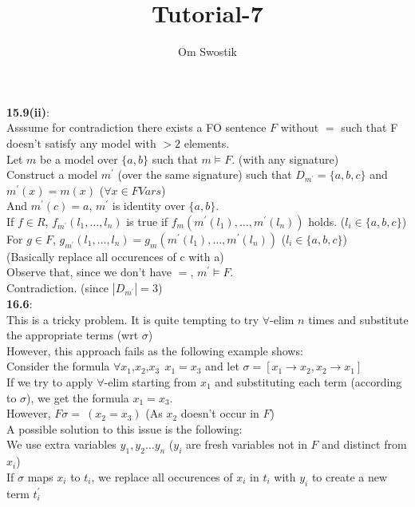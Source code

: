 \documentclass{article}
\title{Tutorial-7}
\author{Om Swostik}
\date{}
\begin{document}
\maketitle
\begin{flushleft}
\textbf{15.9(ii)}: \\
Asssume for contradiction there exists a FO sentence $F$ without $=$ such that F doesn't satisfy any model with $> 2$ elements.\\
Let $m$ be a model over $\{a,b\}$ such that $m \models F$. (with any signature)\\
Construct a model $m^{'}$ (over the same signature) such that $D_{m^{'}}=\{a,b,c\}$ and $m^{'}(x)=m(x)$ ($\forall x\in FVars$)\\
And $m^{'}(c)=a$, $m^{'}$ is identity over $\{a,b\}$.\\
If $f\in R$, $f_{m^{'}}(l_1,\dots,l_n)$ is true if $f_m(m^{'}(l_1),\dots,m^{'}(l_n))$ holds. ($l_i \in \{a,b,c\}$)\\
For $g\in F$, $g_{m^{'}}(l_1,\dots,l_n)= g_m(m^{'}(l_1),\dots,m^{'}(l_n))$ ($l_i \in \{a,b,c\}$) \\
(Basically replace all occurences of c with a)\\
Observe that, since we don't have $=$, $m^{'}\models F$.\\
Contradiction. (since $|D_{m^{'}}|=3$)\\
\textbf{16.6}: \\
This is a tricky problem. It is quite tempting to try $\forall$-elim $n$ times and substitute the appropriate terms (wrt $\sigma$)\\
However, this approach fails as the following example shows:\\       
Consider the formula $\forall x_1\text{,}x_2\text{,}x_3\:\: x_1=x_3$ and let $\sigma= [x_1\rightarrow x_2,x_2\rightarrow x_1]$\\
If we try to apply $\forall$-elim starting from $x_1$ and substituting each term (according to $\sigma$), we get the formula $x_1=x_3$.\\
However, $F\sigma= \:(x_2=x_3)$  (As $x_2$ doesn't occur in $F$)\\
A possible solution to this issue is the following: \\
We use extra variables $y_1,y_2\dots y_n$  ($y_i$ are fresh variables not in $F$ and distinct from $x_i$)\\
If $\sigma$ maps $x_i$ to $t_i$, we replace all occurences of $x_i$ in $t_i$ with $y_i$ to create a new term $t_i^{'}$\\

\end{flushleft}
\end{document}
